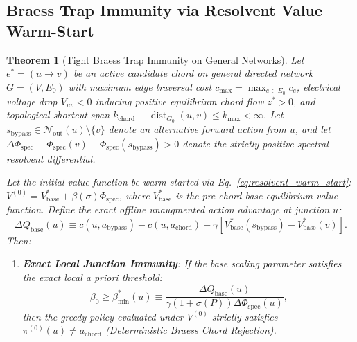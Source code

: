 \documentclass[11pt,a4paper]{article}
\newtheorem{theorem}{Theorem}
\begin{document}
\subsection{Braess Trap Immunity via Resolvent Value Warm-Start}
\begin{theorem}[Tight Braess Trap Immunity on General Networks]
\label{thm:immunity}
\label{thm:trap_immunity}
Let $e^* = (u \to v)$ be an active candidate chord on general directed network $G = (V, E_0)$ with maximum edge traversal cost $c_{\max} = \max_{e \in E_0} c_e$, electrical voltage drop $V_{uv} < 0$ inducing positive equilibrium chord flow $z^* > 0$, and topological shortcut span $k_{\text{chord}} \equiv \operatorname{dist}_{G_0}(u, v) \le k_{\max} < \infty$. Let $s_{\text{bypass}} \in \mathcal{N}_{\text{out}}(u) \setminus \{v\}$ denote an alternative forward action from $u$, and let $\Delta \Phi_{\text{spec}} \equiv \Phi_{\text{spec}}(v) - \Phi_{\text{spec}}(s_{\text{bypass}}) > 0$ denote the strictly positive spectral resolvent differential. 

Let the initial value function be warm-started via Eq.~\eqref{eq:resolvent_warm_start}: $V^{(0)} = V_{\text{base}}^* + \beta(\sigma) \Phi_{\text{spec}}$, where $V_{\text{base}}^*$ is the pre-chord base equilibrium value function. Define the exact offline unaugmented action advantage at junction $u$:
\begin{equation}
\label{eq:delta_q_base_def}
\Delta Q_{\text{base}}(u) \equiv c(u, a_{\text{bypass}}) - c(u, a_{\text{chord}}) + \gamma \left[ V_{\text{base}}^*(s_{\text{bypass}}) - V_{\text{base}}^*(v) \right].
\end{equation}
Then:
\begin{enumerate}
    \item \textbf{Exact Local Junction Immunity}: If the base scaling parameter satisfies the exact local a priori threshold:
    \begin{equation}
    \label{eq:beta_min_local_exact}
    \beta_0 \ge \beta_{\min}^*(u) \equiv \frac{\Delta Q_{\text{base}}(u)}{\gamma (1 + \sigma(P)) \Delta \Phi_{\text{spec}}(u)},
    \end{equation}
    then the greedy policy evaluated under $V^{(0)}$ strictly satisfies $\pi^{(0)}(u) \ne a_{\text{chord}}$ (Deterministic Braess Chord Rejection).
    

\end{enumerate}
\end{theorem}
\end{document}

